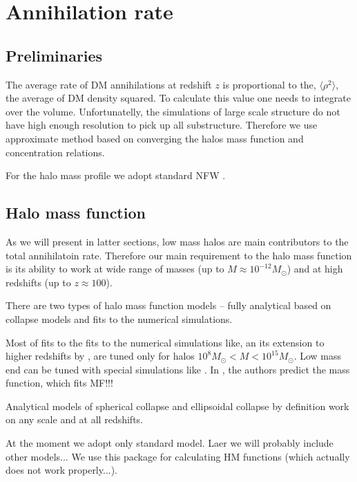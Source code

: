 \section{Annihilation rate}

\subsection{Preliminaries}

The average rate of DM annihilations at redshift $z$ is proportional to the, $\langle \rho^2 \rangle$, the average of DM density squared. To calculate this value one needs to integrate over the volume. Unfortunatelly, the simulations of large scale structure do not have high enough resolution to pick up all substructure. Therefore we use approximate method based on converging the halos mass function and concentration relations.


For the halo mass profile we adopt standard NFW \cite{1997ApJ...490..493N}. 

\subsection{Halo mass function}

As we will present in latter sections, low mass halos are main contributors to the total annihilatoin rate. Therefore our main requirement to the halo mass function is its ability to work at wide range of masses (up to $M \approx 10^{-12}M_\odot$) and at high redshifts (up to $z \approx 100$). 

There are two types of halo mass function models -- fully analytical based on collapse models and fits to the numerical simulations.

Most of fits to the fits to the numerical simulations like, \citet{Tinker_2008} an its extension to higher redshifts by \citet{Behroozi_2013}, are tuned only for halos $10^{8}M_\odot < M < 10^{15}M_\odot$. Low mass end can be tuned with special simulations like \cite{Diemand_2005}. In \cite{Schneider_2013}, the authors predict the mass function, which fits \cite{Diemand_2005} MF!!!

Analytical models of spherical collapse \citep{Press_1974} and ellipsoidal collapse \citep{Sheth_2001} by definition work on any scale and at all redshifts.

At the moment we adopt only standard \citet{Press_1974} model. Laer we will probably include other models... We use this package for calculating HM functions \cite{Murray_2013} (which actually does not work properly...).

